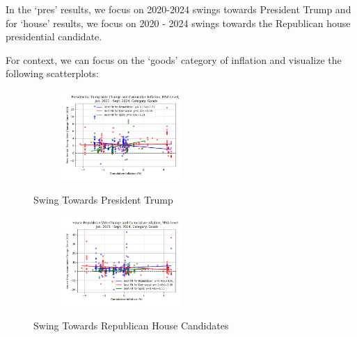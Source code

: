 \documentclass{article}
\begin{document}
In the `pres' results, we focus on 2020-2024 swings towards President Trump and for `house' results, we focus on 2020 - 2024 swings towards the Republican house presidential candidate. 





For context, we can focus on the `goods' category of inflation and visualize the following scatterplots:

\begin{figure}[ht]
\centering
\begin{subfigure}
    \centering
    \includegraphics[width=0.5\textwidth]{pres_goods_msa_swing_scatter.png}
\end{subfigure}
\caption{Swing Towards President Trump}
\end{figure}

\begin{figure}[ht]
\centering
\begin{subfigure}
    \centering
    \includegraphics[width=0.5\textwidth]{house_goods_msa_swing_scatter.png}
\end{subfigure}
\caption{Swing Towards Republican House Candidates}
\end{figure}
\end{document}
